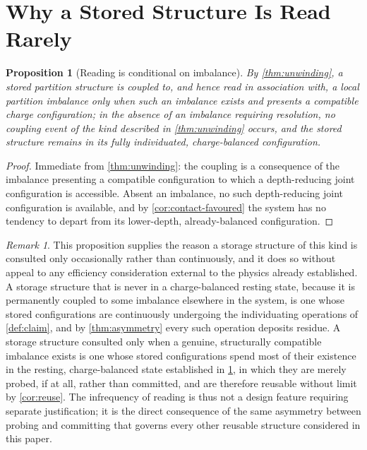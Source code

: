\documentclass[11pt,twocolumn,a4paper]{article}
\theoremstyle{plain}
\newtheorem{proposition}[theorem]{Proposition}
\theoremstyle{definition}
\theoremstyle{remark}
\newtheorem{remark}[theorem]{Remark}
\begin{document}
\section{Why a Stored Structure Is Read Rarely}
\label{sec:rarely}

\begin{proposition}[Reading is conditional on imbalance]
\label{prop:conditional-reading}
By \cref{thm:unwinding}, a stored partition structure is coupled to, and
hence read in association with, a local partition imbalance only when such
an imbalance exists and presents a compatible charge configuration; in the
absence of an imbalance requiring resolution, no coupling event of the kind
described in \cref{thm:unwinding} occurs, and the stored structure remains
in its fully individuated, charge-balanced configuration.
\end{proposition}

\begin{proof}
Immediate from \cref{thm:unwinding}: the coupling is a consequence of the
imbalance presenting a compatible configuration to which a depth-reducing
joint configuration is accessible. Absent an imbalance, no such
depth-reducing joint configuration is available, and by
\cref{cor:contact-favoured} the system has no tendency to depart from its
lower-depth, already-balanced configuration.
\end{proof}

\begin{remark}
This proposition supplies the reason a storage structure of this kind is
consulted only occasionally rather than continuously, and it does so
without appeal to any efficiency consideration external to the physics
already established. A storage structure that is never in a charge-balanced
resting state, because it is permanently coupled to some imbalance
elsewhere in the system, is one whose stored configurations are
continuously undergoing the individuating operations of \cref{def:claim},
and by \cref{thm:asymmetry} every such operation deposits residue. A
storage structure consulted only when a genuine, structurally compatible
imbalance exists is one whose stored configurations spend most of their
existence in the resting, charge-balanced state established in
\cref{prop:conditional-reading}, in which they are merely probed, if at
all, rather than committed, and are therefore reusable without limit by
\cref{cor:reuse}. The infrequency of reading is thus not a design feature
requiring separate justification; it is the direct consequence of the
same asymmetry between probing and committing that governs every other
reusable structure considered in this paper.
\end{remark}
\end{document}
